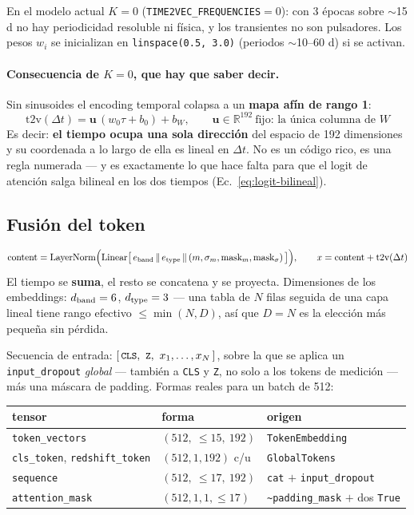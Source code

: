 \documentclass[11pt,a4paper]{article}
\newcommand{\code}[1]{\texttt{\small #1}}
\begin{document}
En el modelo actual $K = 0$ (\code{TIME2VEC\_FREQUENCIES}$=0$): con 3 épocas sobre $\sim$15 d no hay
periodicidad resoluble ni física, y los transientes no son pulsadores. Los pesos $w_i$ se
inicializan en \code{linspace(0.5, 3.0)} (periodos $\sim$10--60 d) si se activan.

\paragraph{Consecuencia de $K=0$, que hay que saber decir.} Sin sinusoides el encoding temporal
colapsa a un \textbf{mapa afín de rango 1}:
\begin{equation}
\mathrm{t2v}(\Delta t) = \mathbf{u}\,(w_0\tau + b_0) + b_W,
\qquad \mathbf{u}\in\mathbb{R}^{192}\ \text{fijo: la única columna de } W
\label{eq:t2v-rank1}
\end{equation}
Es decir: \textbf{el tiempo ocupa una sola dirección} del espacio de 192 dimensiones y su coordenada
a lo largo de ella es lineal en $\Delta t$. No es un código rico, es una regla numerada --- y es
exactamente lo que hace falta para que el logit de atención salga bilineal en los dos tiempos
(Ec.\ \eqref{eq:logit-bilineal}).

\subsection{Fusión del token}
\begin{equation}
\text{content} = \mathrm{LayerNorm}\Bigl(\mathrm{Linear}\bigl[\,e_{\rm band}\,\|\,e_{\rm type}\,\|\,(m,\sigma_m,\text{mask}_m,\text{mask}_\sigma)\,\bigr]\Bigr),
\qquad x = \text{content} + \mathrm{t2v}(\Delta t)
\end{equation}
El tiempo se \textbf{suma}, el resto se concatena y se proyecta. Dimensiones de los embeddings:
$d_{\rm band}=6$, $d_{\rm type}=3$ --- una tabla de $N$ filas seguida de una capa lineal tiene rango
efectivo $\le\min(N,D)$, así que $D=N$ es la elección más pequeña sin pérdida.

Secuencia de entrada: $[\,\code{CLS},\ \code{Z},\ x_1,\dots,x_N\,]$, sobre la que se aplica un
\code{input\_dropout} \emph{global} --- también a \code{CLS} y \code{Z}, no solo a los tokens de
medición --- más una máscara de padding. Formas reales para un batch de 512:

\begin{center}
\begin{tabular}{lll}
\toprule
tensor & forma & origen \\
\midrule
\code{token\_vectors} & $(512,\ \le15,\ 192)$ & \code{TokenEmbedding} \\
\code{cls\_token}, \code{redshift\_token} & $(512, 1, 192)$ c/u & \code{GlobalTokens} \\
\code{sequence} & $(512,\ \le17,\ 192)$ & \code{cat} $+$ \code{input\_dropout} \\
\code{attention\_mask} & $(512, 1, 1, \le17)$ & \code{\textasciitilde{}padding\_mask} $+$ dos \code{True} \\
\bottomrule
\end{tabular}
\end{center}
\end{document}
